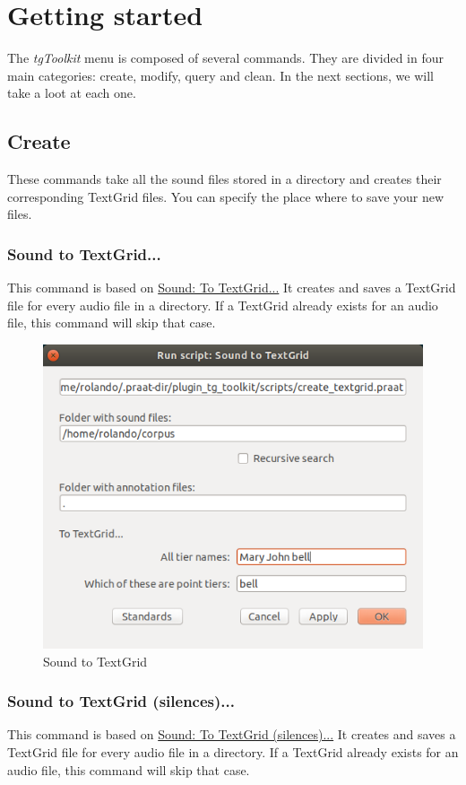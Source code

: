 \documentclass[10pt,a4paper]{article}
\begin{document}
\section{Getting started}
The \emph{tgToolkit} menu is composed of several commands. They are divided in four main categories: create, modify, query and clean. In the next sections, we will take a loot at each one.

\subsection{Create}
These commands take all the sound files stored in a directory and creates their corresponding TextGrid files. You can specify the place where to save your new files.

\subsubsection{Sound to TextGrid...}
This command is based on \href{http://www.fon.hum.uva.nl/praat/manual/Sound__To_TextGrid___.html}{Sound: To TextGrid...} It creates and saves a TextGrid file for every audio file in a directory. If a TextGrid already exists for an audio file, this command will skip that case.

\begin{figure}[H]
	\centering
	\label{fig:sound2tg}
	\includegraphics[scale=0.5]{img/sound2tg}
	\caption{Sound to TextGrid}
\end{figure}

\subsubsection{Sound to TextGrid (silences)...}
This command is based on \href{http://www.fon.hum.uva.nl/praat/manual/Sound__To_TextGrid__silences____.html}{Sound: To TextGrid (silences)...} It creates and saves a TextGrid file for every audio file in a directory. If a TextGrid already exists for an audio file, this command will skip that case.
\end{document}
